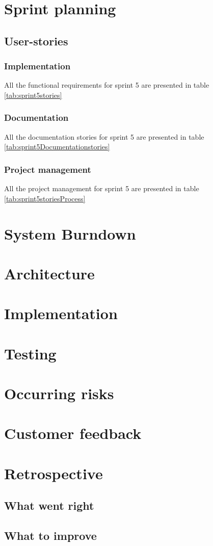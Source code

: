 \section{Sprint planning}
\subsection{User-stories}
\subsubsection*{Implementation}
All the functional requirements for sprint 5 are presented in table \ref{tab:sprint5stories}

\subsubsection*{Documentation}
All the documentation stories for sprint 5 are presented in table \ref{tab:sprint5Documentationstories}

\subsubsection*{Project management}
All the project management for sprint 5 are presented in table \ref{tab:sprint5storiesProcess}

\section{System Burndown}
\section{Architecture}
\section{Implementation}
\section{Testing}
\section{Occurring risks}
\section{Customer feedback}
\section{Retrospective}
\subsection{What went right}
\subsection{What to improve}
